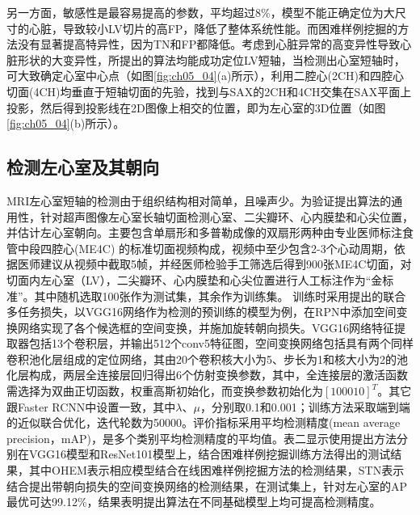 另一方面，敏感性是最容易提高的参数，平均超过8\%，模型不能正确定位为大尺寸的心脏，导致较小LV切片的高FP，降低了整体系统性能。而困难样例挖掘的方法没有显著提高特异性，因为TN和FP都降低。考虑到心脏异常的高变异性导致心脏形状的大变异性，所提出的算法均能成功定位LV短轴，当检测出心室短轴时，可大致确定心室中心点（如图\ref{fig:ch05_04}(a)所示），利用二腔心(2CH)和四腔心切面(4CH)均垂直于短轴切面的先验，找到与SAX的2CH和4CH交集在SAX平面上投影，然后得到投影线在2D图像上相交的位置，即为左心室的3D位置（如图\ref{fig:ch05_04}(b)所示）。

\subsection{检测左心室及其朝向}

MRI左心室短轴的检测由于组织结构相对简单，且噪声少。为验证提出算法的通用性，针对超声图像左心室长轴切面检测心室、二尖瓣环、心内膜垫和心尖位置，并估计左心室朝向。主要包含单扇形和多普勒成像的双扇形两种由专业医师标注食管中段四腔心(ME4C) 的标准切面视频构成，视频中至少包含2-3个心动周期，依据医师建议从视频中截取5帧，并经医师检验手工筛选后得到900张ME4C切面，对切面内左心室（LV），二尖瓣环、心内膜垫和心尖位置进行人工标注作为“金标准”。其中随机选取100张作为测试集，其余作为训练集。
训练时采用提出的联合多任务损失，以VGG16网络作为检测的预训练的模型为例，在RPN中添加空间变换网络实现了各个候选框的空间变换，并施加旋转朝向损失。VGG16网络特征提取器包括13个卷积层，并输出512个conv5特征图，空间变换网络包括具有两个同样卷积池化层组成的定位网络，其由20个卷积核大小为5、步长为1和核大小为2的池化层构成，两层全连接层回归得出6个仿射变换参数，其中，全连接层的激活函数需选择为双曲正切函数，权重高斯初始化，而变换参数初始化为$[1 0 0 0 1 0]^T$。其它跟Faster RCNN中设置一致，其中$\lambda$、$\mu$，分别取0.1和0.001；训练方法采取端到端的近似联合优化，迭代轮数为50000。评价指标采用平均检测精度(mean average precision，mAP)，是多个类别平均检测精度的平均值。表二显示使用提出方法分别在VGG16模型和ResNet101模型上，结合困难样例挖掘训练方法得出的测试结果，其中OHEM表示相应模型结合在线困难样例挖掘方法的检测结果，STN表示结合提出带朝向损失的空间变换网络的检测结果，在测试集上，针对左心室的AP最优可达99.12\%，结果表明提出算法在不同基础模型上均可提高检测精度。

